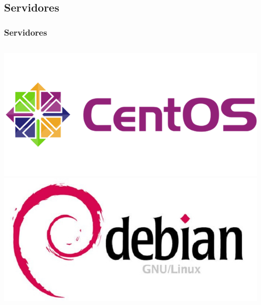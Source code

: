 \subsection{Servidores}
\begin{frame}
    \frametitle{Servidores}
    \begin{columns}
            \includegraphics[width=\textwidth]{centos-logo.png}
            \includegraphics[width=\textwidth]{debian-logo.jpg}
    \end{columns}
\end{frame}

